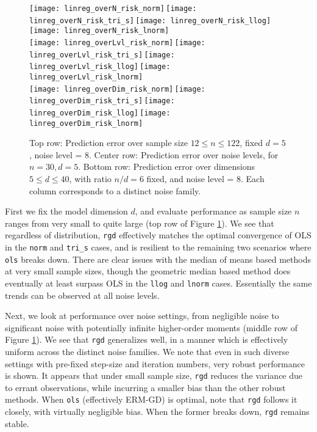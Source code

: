 \documentclass[11pt,oneside]{article}
\theoremstyle{definition} \newtheorem{defn}{Definition}       %
\theoremstyle{plain} \newtheorem{prop}[defn]{Proposition}           %
\theoremstyle{plain} \newtheorem{thm}[defn]{Theorem}                %
\theoremstyle{plain} \newtheorem{lem}[defn]{Lemma}                  %
\theoremstyle{plain} \newtheorem{cor}[defn]{Corollary}              %
\theoremstyle{remark} \newtheorem{rmk}[defn]{Remark}                %
\theoremstyle{remark} \newtheorem{ex}[defn]{Example}                %
\begin{document}
\begin{figure}[t]
\centering
\texttt{[image: linreg\_overN\_risk\_norm]}\,\texttt{[image: linreg\_overN\_risk\_tri\_s]}\,\texttt{[image: linreg\_overN\_risk\_llog]}\,\texttt{[image: linreg\_overN\_risk\_lnorm]}\\
\texttt{[image: linreg\_overLvl\_risk\_norm]}\,\texttt{[image: linreg\_overLvl\_risk\_tri\_s]}\,\texttt{[image: linreg\_overLvl\_risk\_llog]}\,\texttt{[image: linreg\_overLvl\_risk\_lnorm]}\\
\texttt{[image: linreg\_overDim\_risk\_norm]}\,\texttt{[image: linreg\_overDim\_risk\_tri\_s]}\,\texttt{[image: linreg\_overDim\_risk\_llog]}\,\texttt{[image: linreg\_overDim\_risk\_lnorm]}
\caption{Top row: Prediction error over sample size $12 \leq n \leq 122$, fixed $d=5$, noise level = $8$. Center row: Prediction error over noise levels, for $n=30, d=5$. Bottom row: Prediction error over dimensions $5 \leq d \leq 40$, with ratio $n/d = 6$ fixed, and noise level = $8$. Each column corresponds to a distinct noise family.}
\label{fig:multinoise_linreg}
\end{figure}

First we fix the model dimension $d$, and evaluate performance as sample size $n$ ranges from very small to quite large (top row of Figure \ref{fig:multinoise_linreg}). We see that regardless of distribution, \texttt{rgd} effectively matches the optimal convergence of OLS in the \texttt{norm} and \texttt{tri\_s} cases, and is resilient to the remaining two scenarios where \texttt{ols} breaks down. There are clear issues with the median of means based methods at very small sample sizes, though the geometric median based method does eventually at least surpass OLS in the \texttt{llog} and \texttt{lnorm} cases. Essentially the same trends can be observed at all noise levels.

Next, we look at performance over noise settings, from negligible noise to significant noise with potentially infinite higher-order moments (middle row of Figure \ref{fig:multinoise_linreg}). We see that \texttt{rgd} generalizes well, in a manner which is effectively uniform across the distinct noise families. We note that even in such diverse settings with pre-fixed step-size and iteration numbers, very robust performance is shown. It appears that under small sample size, \texttt{rgd} reduces the variance due to errant observations, while incurring a smaller bias than the other robust methods. When \texttt{ols} (effectively ERM-GD) is optimal, note that \texttt{rgd} follows it closely, with virtually negligible bias. When the former breaks down, \texttt{rgd} remains stable.
\end{document}

